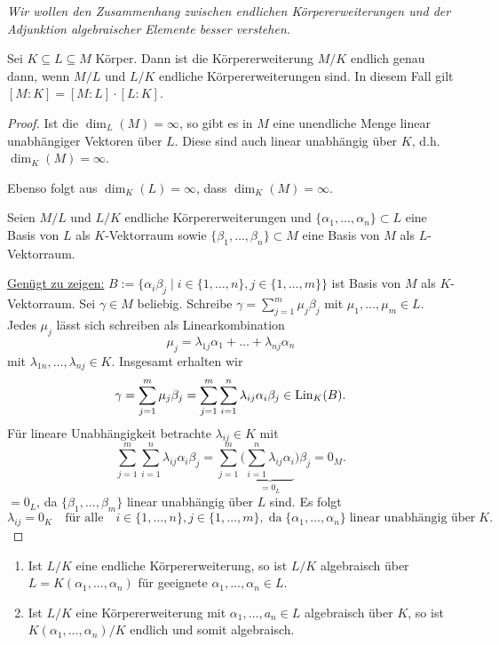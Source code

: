 \begin{framed}
	\textit{Wir wollen den Zusammenhang zwischen endlichen Körpererweiterungen und der Adjunktion algebraischer Elemente besser verstehen.}
\end{framed}
\begin{satz}[Gradformel]\label{satz7_16}
	Sei $K \subseteq L \subseteq M$ Körper. Dann ist die Körpererweiterung $M/K$ endlich genau dann, wenn $M/L$ und $L/K$ endliche Körpererweiterungen sind. In diesem Fall gilt $[M:K] = [M:L] \cdot [L:K]$.
\end{satz}
\begin{proof}
	Ist die $\dim_L(M) = \infty$, so gibt es in $M$ eine unendliche Menge linear unabhängiger Vektoren über $L$. Diese sind auch linear unabhängig über $K$, d.h. $\dim_K(M) = \infty$.
	
	Ebenso folgt aus $\dim_K(L) = \infty$, dass $\dim_K(M) = \infty$.
	
	Seien $M/L$ und $L/K$ endliche Körpererweiterungen und $\{\alpha_1, \dots, \alpha_n\} \subset L$ eine Basis von $L$ als $K$-Vektorraum sowie $\{\beta_1, \dots, \beta_n\} \subset M$ eine Basis von $M$ als $L$-Vektorraum. 
	
	\underline{Genügt zu zeigen:} $B := \{\alpha_i \beta_j \mid i \in \{1, \dots, n\}, j \in \{1, \dots, m\}\}$ ist Basis von $M$ als $K$-Vektorraum. Sei $\gamma \in M$ beliebig. Schreibe $\gamma = \sum_{j=1}^m \mu_j \beta_j$ mit $\mu_1, \dots, \mu_m \in L$. Jedes $\mu_j$ lässt sich schreiben als Linearkombination
	\[\mu_j = \lambda_{1j} \alpha_1 + \dots + \lambda_{nj} \alpha_n\]
	mit $\lambda_{1n}, \dots, \lambda_{nj} \in K$. Insgesamt erhalten wir 
	\[\gamma = \sum_{j=1}^m \mu_j \beta_j = \sum_{j=1}^m \sum_{i=1}^n \lambda_{ij} \alpha_i \beta_j \in \operatorname{Lin}_K(B).\]
	Für lineare Unabhängigkeit  betrachte $\lambda_{ij} \in K$ mit 
	\[\sum_{j=1}^m \sum_{i=1}^n \lambda_{ij} \alpha_i \beta_j = \sum_{j=1}^m \bigg(\underbrace{\sum_{i=1}^n \lambda_{ij} \alpha_i}_{=0_L} \bigg)\beta_j = 0_M.\]
	$=0_L$, da $\{\beta_1, \dots, \beta_m\}$ linear unabhängig über $L$ sind. Es folgt
	\[\lambda_{ij} = 0_K \quad\text{für alle}\quad i \in \{1, \dots, n\}, j \in \{1, \dots, m\},\;\text{da}\;\{\alpha_1,\dots, \alpha_n\} \;\text{linear unabhängig über}\; K.\]
\end{proof}
\begin{kor}\label{kor7_17}
	\begin{enumerate}[label=(\alph*)]
		\item Ist $L/K$ eine endliche Körpererweiterung, so ist $L/K$ algebraisch über $L = K(\alpha_1, \dots, \alpha_n)$ für geeignete $\alpha_1, \dots, \alpha_n \in L$.
		\item Ist $L/K$ eine Körpererweiterung mit $\alpha_1, \dots, a_n \in L$ algebraisch über $K$, so ist $K(\alpha_1, \dots, \alpha_n)/K$ endlich und somit algebraisch.
	\end{enumerate}
\end{kor}
